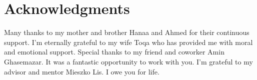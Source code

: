 
\chapter{Acknowledgments}

Many thanks to my mother and brother Hanaa and Ahmed for their continuous support. I'm eternally grateful to my wife Toqa who has provided me with moral and emotional support.
Special thanks to my friend and coworker Amin Ghasemazar. It was a fantastic opportunity to work with you.
I'm grateful to my advisor and mentor Mieszko Lis. I owe you for life.
